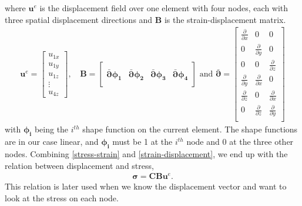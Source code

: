 where $\bm{u}^e$ is the displacement field over one element with four nodes, each with three spatial displacement directions and $\bm{B}$ is the strain-displacement matrix.
\begin{align*}
\bm{u}^e = 
\begin{bmatrix}
u_{1x} \\
u_{1y} \\
u_{1z} \\
\vdots \\
u_{4z}
\end{bmatrix}, \,
&\bm{B} = 
\begin{bmatrix} \\
\bar{\bm{\partial}} \bm{\phi_1} & \bar{\bm{\partial}} \bm{\phi_2} & \bar{\bm{\partial}} \bm{\phi_3} & \bar{\bm{\partial}} \bm{\phi_4} \\[1em]
\end{bmatrix} \textrm{ and } 
\bar{\bm{\partial}} = 
\begin{bmatrix}
\frac{\partial}{\partial x} & 0 & 0 \\[0.3em]
0 & \frac{\partial}{\partial y} & 0 \\[0.3em]
0 & 0 & \frac{\partial}{\partial z} \\[0.3em]
\frac{\partial}{\partial y} & \frac{\partial}{\partial x} & 0 \\[0.3em]
\frac{\partial}{\partial z} & 0 & \frac{\partial}{\partial x}\\[0.3em]
0 & \frac{\partial}{\partial z} & \frac{\partial}{\partial y} \\
\end{bmatrix}
\end{align*}
with $\bm{\phi_i}$ being the $i^{th}$ shape function on the current element. The shape functions are in our case linear, and $\bm{\phi_i}$ must be 1 at the $i^{th}$ node and 0 at the three other nodes. Combining \eqref{stress-strain} and \eqref{strain-displacement}, we end up with the relation between displacement and stress,
\begin{align}
\label{stress-displacement}
\bm{\sigma} = \bm{C} \bm{B} \bm{u}^e.
\end{align}
This relation is later used when we know the displacement vector and want to look at the stress on each node. 









